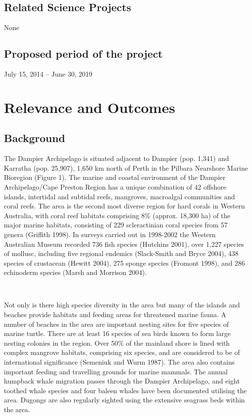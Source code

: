 \documentclass[version=last,
    paper=a4,                               %
    10pt,                                   %
    dvipsnames,
    oneside,                              %
    headings=openany,                       %
    open=any,
    BCOR=7mm,                               %
    DIV=15,     %
]{scrbook}
\begin{document}
\subsection*{Related Science Projects}

None


\subsection*{Proposed period of the project}
July 15, 2014 -- June 30, 2019



\section*{Relevance and Outcomes}


\subsection*{Background}

The Dampier Archipelago is situated adjacent to Dampier (pop. 1,341) and
Karratha (pop. 25,907), 1,650 km north of Perth in the Pilbara Nearshore
Marine Bioregion (Figure 1). The marine and coastal environment of the
Dampier Archipelago/Cape Preston Region has a unique combination of 42
offshore islands, intertidal and subtidal reefs, mangroves, macroalgal
communities and coral reefs. The area is the second most diverse region
for hard corals in Western Australia, with coral reef habitats
comprising 8\% (approx. 18,300 ha) of the major marine habitats,
consisting of 229 scleractinian coral species from 57 genera (Griffith
1998). In surveys carried out in 1998-2002 the Western Australian Museum
recorded 736 fish species (Hutchins 2001), over 1,227 species of
mollusc, including five regional endemics (Slack-Smith and Bryce 2004),
438 species of crustacean (Hewitt 2004), 275 sponge species (Fromont
1998), and 286 echinoderm species (Marsh and Morrison 2004).

~

Not only is there high species diversity in the area but many of the
islands and beaches provide habitats and feeding areas for threatened
marine fauna. A number of beaches in the area are important nesting
sites for five species of marine turtle. There are at least 16 species
of sea birds known to form large nesting colonies in the region. Over
50\% of the mainland shore is lined with complex mangrove habitats,
comprising six species, and are considered to be of international
significance (Semeniuk and Wurm 1987). The area also contains important
feeding and travelling grounds for marine mammals. The annual humpback
whale migration passes through the Dampier Archipelago, and eight
toothed whale species and four baleen whales have been documented
utilising the area. Dugongs are also regularly sighted using the
extensive seagrass beds within the area.
\end{document}
